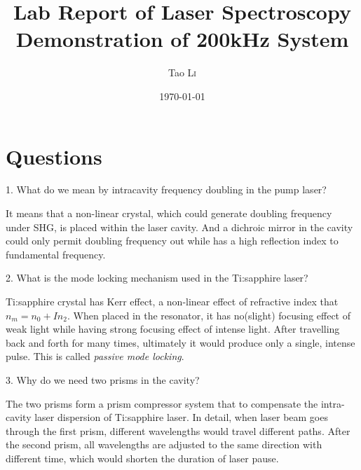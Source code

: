 \documentclass{article}
\title{Lab Report of Laser Spectroscopy \\ Demonstration of 200kHz System} %
\author{Tao \textsc{Li}} %
\date{\today} %
\begin{document}
\maketitle %



\section{Questions}
1. What do we mean by intracavity frequency doubling in the pump laser?\par
It means that a non-linear crystal, which could generate doubling frequency under SHG, is placed within the laser cavity. And a dichroic mirror in the cavity could only permit doubling frequency out while has a high reflection index to fundamental frequency.\\
\par
2. What is the mode locking mechanism used in the Ti:sapphire laser?\par
Ti:sapphire crystal has Kerr effect, a non-linear effect of refractive index that $n_m=n_0+In_2$. When placed in the resonator, it has no(slight) focusing effect of weak light while having strong focusing effect of intense light. After travelling back and forth for many times, ultimately it would produce only a single, intense pulse. This is called \textit{passive mode locking}.   \\
\par 
3. Why do we need two prisms in the cavity?\par 
The two prisms form a prism compressor system that to compensate the intra-cavity laser dispersion of Ti:sapphire laser. In detail, when laser beam goes through the first prism, different wavelengths would travel different paths. After the second prism, all wavelengths are adjusted to the same direction with different time, which would shorten the duration of laser pause.\\
\par 
\end{document}

